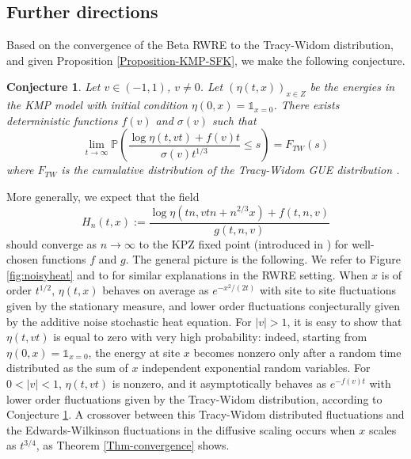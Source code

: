 \documentclass[a4paper,11pt,oneside,reqno]{amsart}
\newtheorem{conjecture}[theorem]{Conjecture}
\theoremstyle{definition}
\renewcommand{\leq}{\leqslant}
\numberwithin{equation}{section}
\begin{document}
\subsection{Further directions} 
\label{sec:furtherdirections} 
 Based on the convergence of the Beta RWRE to the Tracy-Widom distribution, and given Proposition \ref{Proposition-KMP-SFK}, we make the following conjecture.
\begin{conjecture}
	\label{conjecture}
	Let $v\in (-1,1)$, $v\neq 0$. Let $(\eta(t,x))_{x\in Z}$ be the energies in  the KMP model with initial condition $\eta(0,x)=\mathds{1}_{x=0}$. There exists deterministic functions $f(v)$ and $\sigma(v)$ such that 
	$$ \lim_{t\to\infty} \mathbb P\left(\frac{\log \eta(t,vt)+f(v)t}{\sigma(v) t^{1/3}}\leq s\right)=F_{TW}(s)  $$
	 where $F_{TW}$ is the cumulative distribution of the Tracy-Widom GUE distribution \cite{tracy1992level}. 
\end{conjecture}
More generally, we expect that the field 
$$ H_n(t,x)  := \frac{\log \eta(tn,vtn + n^{2/3}x) + f(t,n,v)}{g(t,n,v)} $$
should converge as $n \to\infty$ to the KPZ fixed point (introduced in \cite{matetski2021kpz}) for well-chosen functions $f$ and $g$. The general picture is the following. We refer to Figure \ref{fig:noisyheat} and to  \cite{B-LD-moderate} for similar explanations in the RWRE setting. When $x$ is of order $t^{1/2}$,  $\eta(t,x)$ behaves on average as $e^{-x^2/(2t)}$  with site to site fluctuations given by the stationary measure, and lower order fluctuations conjecturally given by the additive noise stochastic heat equation.  For $\vert v\vert >1$, it is easy to show that $\eta(t,vt)$ is equal to zero with very high probability: indeed, starting from $\eta(0,x)=\mathds{1}_{x=0}$, the energy at site $x$ becomes nonzero only after a random time distributed as the sum of $x$ independent exponential random variables. For $0<\vert v\vert <1$, $\eta(t,vt)$  is nonzero, and it asymptotically behaves as $e^{-f(v)t}$ with lower order fluctuations given by the Tracy-Widom distribution, according to Conjecture \ref{conjecture}. A crossover between this Tracy-Widom distributed fluctuations and the Edwards-Wilkinson fluctuations in the diffusive scaling occurs when $x$ scales as $t^{3/4}$, as Theorem \ref{Thm-convergence} shows. 
\end{document}
